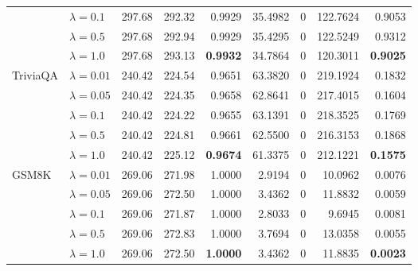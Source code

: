 \begin{table}[t]
{\begin{tabular}{l l rrrrrrr}
 & $\lambda{=}0.1$ & 297.68 & 292.32 & 0.9929 & 35.4982 & \cellcolor{cyan!12} $0$ & 122.7624 & 0.9053 \\
 & $\lambda{=}0.5$ & 297.68 & 292.94 & 0.9929 & 35.4295 & \cellcolor{cyan!12} $0$ & 122.5249 & 0.9312 \\
 & $\lambda{=}1.0$ & 297.68 & 293.13 & \textbf{0.9932} & 34.7864 & \cellcolor{cyan!12} $0$ & 120.3011 & \textbf{0.9025} \\
\midrule
TriviaQA & $\lambda{=}0.01$ & 240.42 & 224.54 & 0.9651 & 63.3820 & \cellcolor{cyan!12} $0$ & 219.1924 & 0.1832 \\
 & $\lambda{=}0.05$ & 240.42 & 224.35 & 0.9658 & 62.8641 & \cellcolor{cyan!12} $0$ & 217.4015 & 0.1604 \\
 & $\lambda{=}0.1$ & 240.42 & 224.22 & 0.9655 & 63.1391 & \cellcolor{cyan!12} $0$ & 218.3525 & 0.1769 \\
 & $\lambda{=}0.5$ & 240.42 & 224.81 & 0.9661 & 62.5500 & \cellcolor{cyan!12} $0$ & 216.3153 & 0.1868 \\
 & $\lambda{=}1.0$ & 240.42 & 225.12 & \textbf{0.9674} & 61.3375 & \cellcolor{cyan!12} $0$ & 212.1221 & \textbf{0.1575} \\
\midrule
GSM8K & $\lambda{=}0.01$ & 269.06 & 271.98 & 1.0000 & 2.9194 & \cellcolor{cyan!12} $0$ & 10.0962 & 0.0076 \\
 & $\lambda{=}0.05$ & 269.06 & 272.50 & 1.0000 & 3.4362 & \cellcolor{cyan!12} $0$ & 11.8832 & 0.0059 \\
 & $\lambda{=}0.1$ & 269.06 & 271.87 & 1.0000 & 2.8033 & \cellcolor{cyan!12} $0$ & 9.6945 & 0.0081 \\
 & $\lambda{=}0.5$ & 269.06 & 272.83 & 1.0000 & 3.7694 & \cellcolor{cyan!12} $0$ & 13.0358 & 0.0055 \\
 & $\lambda{=}1.0$ & 269.06 & 272.50 & \textbf{1.0000} & 3.4362 & \cellcolor{cyan!12} $0$ & 11.8835 & \textbf{0.0023} \\
\bottomrule
\end{tabular}}
\end{table}